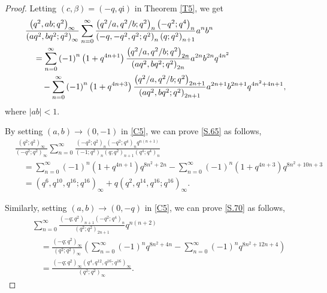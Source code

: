 \documentclass[reqno,12pt]{amsart}
\theoremstyle{remark}
\numberwithin{equation}{section}
\begin{document}
\begin{proof}
Letting  $\left(c,\beta\right)=\left(-q,q\mathrm{i}\right)$ in Theorem \ref{T5}, we get
\begin{align}
&\frac{\left(q^2,ab;q^2\right)_{\infty}}{\left(aq^2,bq^2;q^2\right)_{\infty}}
\sum_{n=0}^{\infty}
\frac{\left(q^2/a,q^2/b;q^2\right)_n\left(-q^2;q^4\right)_n}{\left(-q,-q^2,q^2;q^2\right)_{n}\left(q;q^2\right)_{n+1}}a^nb^n\notag\\
&\quad=
\sum_{n=0}^{\infty}\left(-1\right)^n\left(1+q^{4n+1}\right)\frac{\left(q^2/a,q^2/b;q^2\right)_{2n}}
{\left(aq^2,bq^2;q^2\right)_{2n}}a^{2n}b^{2n}q^{4n^2}\notag\\
&\qquad-
\sum_{n=0}^{\infty}\left(-1\right)^n\left(1+q^{4n+3}\right)\frac{\left(q^2/a,q^2/b;q^2\right)_{2n+1}}
{\left(aq^2,bq^2;q^2\right)_{2n+1}}a^{2n+1}b^{2n+1}q^{4n^2+4n+1},\label{C5}
\end{align}
where $|ab|<1$.

By setting $\left(a,b\right)\to\left(0,-1\right)$ in \eqref{C5}, we can  prove \eqref{S.65} as follows,
\begin{align*}
&\frac{\left(q^2;q^2\right)_{\infty}}{\left(-q^2;q^2\right)_{\infty}}\sum_{n=0}^{\infty}\frac{\left(-q^2;q^2\right)_n
\left(-q^2;q^4\right)_nq^{n\left(n+1\right)}}
{\left(-1;q^2\right)_{n}\left(q;q^2\right)_{n+1}
\left(q^4;q^4\right)_{n}}\nonumber\\
&\quad=\sum_{n=0}^{\infty}\left(-1\right)^n\left(1+q^{4n+1}\right)
q^{8n^2+2n}-\sum_{n=0}^{\infty}\left(-1\right)^n
\left(1+q^{4n+3}\right)q^{8n^2+10n+3}\nonumber\\
&\quad={\left(q^6,q^{10},q^{16};q^{16}\right)_{\infty}
+q\left(q^2,q^{14},q^{16};q^{16}\right)_{\infty}}.
\end{align*}

Similarly, setting $\left(a,b\right)\to\left(0,-q\right)$ in \eqref{C5},  we can prove  \eqref{S.70} as follows,
\begin{align*}
&\sum_{n=0}^{\infty}\frac{\left(-q;q^2\right)_{n+1}
\left(-q^2;q^4\right)_n}
{\left(q^2;q^2\right)_{2n+1}}q^{n\left(n+2\right)}\\
&\quad=\frac{\left(-q;q^2\right)_{\infty}}{\left(q^2;q^2\right)_{\infty}}\left(\sum_{n=0}^{\infty}\left(-1\right)^n
q^{8n^2+4n}-\sum_{n=0}^{\infty}\left(-1\right)^n
q^{8n^2+12n+4}\right)\nonumber\\
&\quad=\frac{\left(-q;q^2\right)_{\infty}
\left(q^4,q^{12},q^{16};q^{16}\right)_{\infty}}{\left(q^2;q^2\right)_{\infty}}.
\end{align*}


\end{proof}
\end{document}

